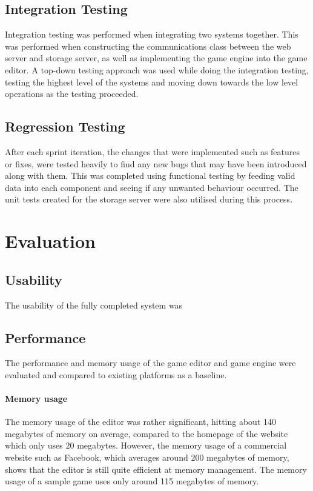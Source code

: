 	\subsection{Integration Testing}
	Integration testing was performed when integrating two systems together. This was performed when constructing the communications class between the web server and storage server, as well as implementing the game engine into the game editor. A top-down testing approach was used while doing the integration testing, testing the highest level of the systems and moving down towards the low level operations as the testing proceeded.

	\subsection{Regression Testing}
	After each sprint iteration, the changes that were implemented such as features or fixes, were tested heavily to find any new bugs that may have been introduced along with them. This was completed using functional testing by feeding valid data into each component and seeing if any unwanted behaviour occurred. The unit tests created for the storage server were also utilised during this process.

\section{Evaluation}
	\subsection{Usability}
	The usability of the fully completed system was 

	\subsection{Performance}
	The performance and memory usage of the game editor and game engine were evaluated and compared to existing platforms as a baseline.

	\paragraph{Memory usage}
	The memory usage of the editor was rather significant, hitting about 140 megabytes of memory on average, compared to the homepage of the website which only uses 20 megabytes. However, the memory usage of a commercial website such as Facebook, which averages around 200 megabytes of memory, shows that the editor is still quite efficient at memory management. The memory usage of a sample game uses only around 115 megabytes of memory.

